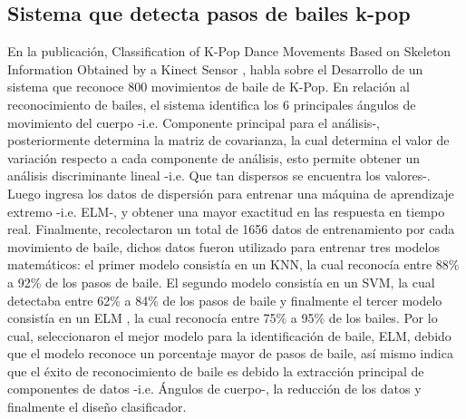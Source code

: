 \subsection{Sistema que detecta pasos de bailes k-pop} \label{tr:9} 
En la publicaci\'on, Classification of K-Pop Dance Movements Based on Skeleton Information Obtained by a Kinect Sensor \cite{kim2017classification}, habla sobre el Desarrollo de un sistema que reconoce 800 movimientos de baile de K-Pop.
\medbreak 
En relaci\'on al reconocimiento de bailes, el sistema identifica los 6 principales \'angulos de movimiento del cuerpo -i.e. Componente principal para el an\'alisis-, posteriormente determina la matriz de covarianza, la cual determina el valor de variaci\'on respecto a cada componente de an\'alisis,  esto permite obtener un an\'alisis discriminante lineal -i.e. Que tan dispersos se encuentra los valores-.
\medbreak 
Luego ingresa los datos de dispersi\'on para entrenar una  m\'aquina de aprendizaje extremo -i.e. ELM-, y obtener una mayor exactitud en las respuesta en tiempo real.
\medbreak 
Finalmente,  recolectaron un total de 1656 datos de entrenamiento por cada movimiento de baile, dichos datos fueron utilizado para entrenar tres modelos matem\'aticos: el primer modelo consist\'ia en un KNN, la cual reconoc\'ia entre 88\% a 92\% de los pasos de baile. El segundo modelo consist\'ia en un SVM, la cual detectaba entre 62\% a 84\% de los pasos de baile y finalmente el tercer modelo consist\'ia en un ELM , la cual reconoc\'ia entre 75\% a 95\% de los bailes.
\medbreak 
Por lo cual,   seleccionaron el mejor modelo para la identificaci\'on de baile, ELM, debido que el modelo reconoce un porcentaje mayor de pasos de baile, as\'i mismo indica que el \'exito de reconocimiento de baile es debido la extracci\'on principal de componentes de datos -i.e. \'Angulos de cuerpo-, la reducci\'on de los datos y finalmente  el dise\~no clasificador.
